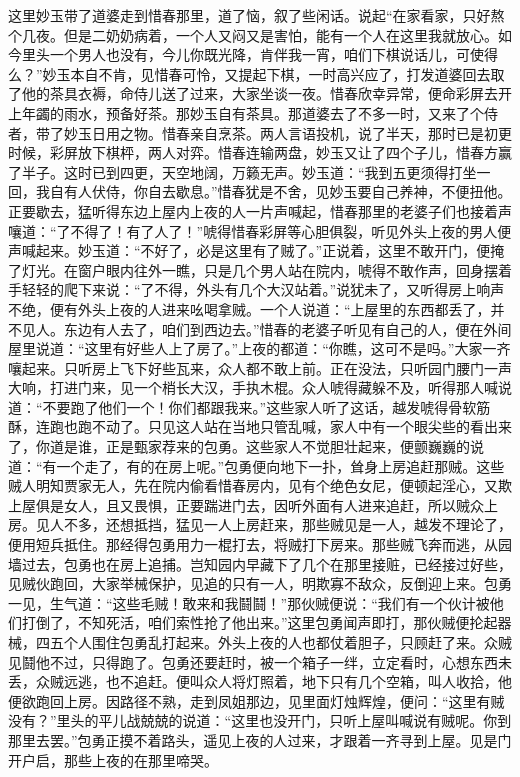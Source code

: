 \begin{parag}
    这里妙玉带了道婆走到惜春那里，道了恼，叙了些闲话。说起“在家看家，只好熬个几夜。但是二奶奶病着，一个人又闷又是害怕，能有一个人在这里我就放心。如今里头一个男人也没有，今儿你既光降，肯伴我一宵，咱们下棋说话儿，可使得么？”妙玉本自不肯，见惜春可怜，又提起下棋，一时高兴应了，打发道婆回去取了他的茶具衣褥，命侍儿送了过来，大家坐谈一夜。惜春欣幸异常，便命彩屏去开上年蠲的雨水，预备好茶。那妙玉自有茶具。那道婆去了不多一时，又来了个侍者，带了妙玉日用之物。惜春亲自烹茶。两人言语投机，说了半天，那时已是初更时候，彩屏放下棋枰，两人对弈。惜春连输两盘，妙玉又让了四个子儿，惜春方赢了半子。这时已到四更，天空地阔，万籁无声。妙玉道：“我到五更须得打坐一回，我自有人伏侍，你自去歇息。”惜春犹是不舍，见妙玉要自己养神，不便扭他。正要歇去，猛听得东边上屋内上夜的人一片声喊起，惜春那里的老婆子们也接着声嚷道：“了不得了！有了人了！”唬得惜春彩屏等心胆俱裂，听见外头上夜的男人便声喊起来。妙玉道：“不好了，必是这里有了贼了。”正说着，这里不敢开门，便掩了灯光。在窗户眼内往外一瞧，只是几个男人站在院内，唬得不敢作声，回身摆着手轻轻的爬下来说：“了不得，外头有几个大汉站着。”说犹未了，又听得房上响声不绝，便有外头上夜的人进来吆喝拿贼。一个人说道：“上屋里的东西都丢了，并不见人。东边有人去了，咱们到西边去。”惜春的老婆子听见有自己的人，便在外间屋里说道：“这里有好些人上了房了。”上夜的都道：“你瞧，这可不是吗。”大家一齐嚷起来。只听房上飞下好些瓦来，众人都不敢上前。正在没法，只听园门腰门一声大响，打进门来，见一个梢长大汉，手执木棍。众人唬得藏躲不及，听得那人喊说道：“不要跑了他们一个！你们都跟我来。”这些家人听了这话，越发唬得骨软筋酥，连跑也跑不动了。只见这人站在当地只管乱喊，家人中有一个眼尖些的看出来了，你道是谁，正是甄家荐来的包勇。这些家人不觉胆壮起来，便颤巍巍的说道：“有一个走了，有的在房上呢。”包勇便向地下一扑，耸身上房追赶那贼。这些贼人明知贾家无人，先在院内偷看惜春房内，见有个绝色女尼，便顿起淫心，又欺上屋俱是女人，且又畏惧，正要踹进门去，因听外面有人进来追赶，所以贼众上房。见人不多，还想抵挡，猛见一人上房赶来，那些贼见是一人，越发不理论了，便用短兵抵住。那经得包勇用力一棍打去，将贼打下房来。那些贼飞奔而逃，从园墙过去，包勇也在房上追捕。岂知园内早藏下了几个在那里接赃，已经接过好些，见贼伙跑回，大家举械保护，见追的只有一人，明欺寡不敌众，反倒迎上来。包勇一见，生气道：“这些毛贼！敢来和我鬪鬪！”那伙贼便说：“我们有一个伙计被他们打倒了，不知死活，咱们索性抢了他出来。”这里包勇闻声即打，那伙贼便抡起器械，四五个人围住包勇乱打起来。外头上夜的人也都仗着胆子，只顾赶了来。众贼见鬪他不过，只得跑了。包勇还要赶时，被一个箱子一绊，立定看时，心想东西未丢，众贼远逃，也不追赶。便叫众人将灯照着，地下只有几个空箱，叫人收拾，他便欲跑回上房。因路径不熟，走到凤姐那边，见里面灯烛辉煌，便问：“这里有贼没有？”里头的平儿战兢兢的说道：“这里也没开门，只听上屋叫喊说有贼呢。你到那里去罢。”包勇正摸不着路头，遥见上夜的人过来，才跟着一齐寻到上屋。见是门开户启，那些上夜的在那里啼哭。
\end{parag}



